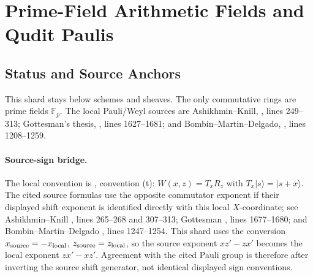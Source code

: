 
\section{Prime-Field Arithmetic Fields and Qudit Paulis}
\label{sec:prime-field-arithmetic-fields-qudit-paulis}

\subsection{Status and Source Anchors}

This shard stays below schemes and sheaves.  The only commutative rings are
prime fields \(\mathbb F_p\).  The local Pauli/Weyl sources are Ashikhmin--Knill,
, lines 249--313; Gottesman's thesis, , lines 1627--1681; and Bombin--Martin--Delgado, , lines 1208--1259.

\paragraph{Source-sign bridge.}
The local convention is , convention (t): \(W(x,z)=T_xR_z\) with \(T_x|s\rangle=|s+x\rangle\).  The cited source formulas use the opposite commutator exponent if their displayed shift exponent is identified directly with this local \(X\)-coordinate; see Ashikhmin--Knill , lines 265--268 and 307--313; Gottesman , lines 1677--1680; and Bombin--Martin--Delgado , lines 1247--1254.  This shard uses the conversion
\(x_{\rm source}=-x_{\rm local}\), \(z_{\rm source}=z_{\rm local}\), so the source exponent \(xz'-zx'\) becomes the local exponent \(zx'-xz'\).  Agreement with the cited Pauli group is therefore after inverting the source shift generator, not identical displayed sign conventions.

